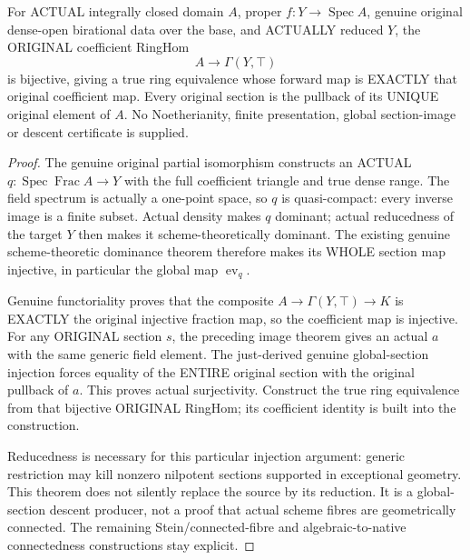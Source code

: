 \begin{theorem}
\label{scheme:actual-reduced-proper-birational-global-sections}
\leanok
{}
For ACTUAL integrally closed domain $A$, proper
$f:Y\to\operatorname{Spec}A$, genuine original dense-open birational data
over the base, and ACTUALLY reduced $Y$, the ORIGINAL coefficient RingHom
\[
 A\longrightarrow\Gamma(Y,\top)
\]
is bijective, giving a true ring equivalence whose forward map is EXACTLY
that original coefficient map. Every original section is the pullback of
its UNIQUE original element of $A$. No Noetherianity, finite presentation,
global section-image or descent certificate is supplied.
\end{theorem}
\begin{proof}
The genuine original partial isomorphism constructs an ACTUAL
$q:\operatorname{Spec}\operatorname{Frac}A\to Y$ with the full coefficient
triangle and true dense range. The field spectrum is actually a one-point
space, so $q$ is quasi-compact: every inverse image is a finite subset.
Actual density makes $q$ dominant; actual reducedness of the target $Y$
then makes it scheme-theoretically dominant. The existing genuine
scheme-theoretic dominance theorem therefore makes its WHOLE section map
injective, in particular the global map $\operatorname{ev}_q$.

Genuine functoriality proves that the composite
$A\to\Gamma(Y,\top)\to K$ is EXACTLY the original injective fraction map,
so the coefficient map is injective. For any ORIGINAL section $s$, the
preceding image theorem gives an actual $a$ with the same generic field
element. The just-derived genuine global-section injection forces equality
of the ENTIRE original section with the original pullback of $a$.
This proves actual surjectivity. Construct the true ring equivalence from
that bijective ORIGINAL RingHom; its coefficient identity is built into
the construction.

Reducedness is necessary for this particular injection argument: generic
restriction may kill nonzero nilpotent sections supported in exceptional
geometry. This theorem does not silently replace the source by its reduction.
It is a global-section descent producer, not a proof that actual scheme
fibres are geometrically connected. The remaining Stein/connected-fibre
and algebraic-to-native connectedness constructions stay explicit.
\end{proof}
